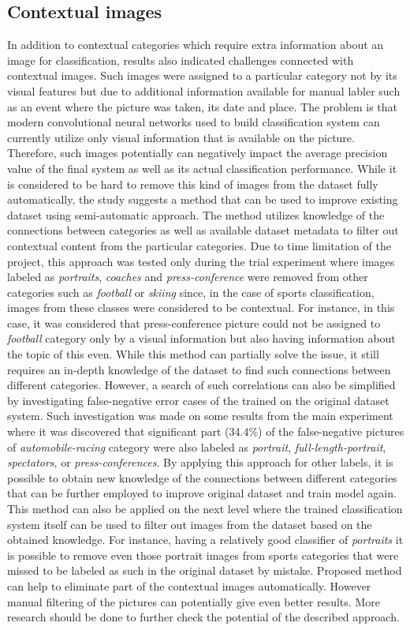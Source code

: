 \subsection{Contextual images}
In addition to contextual categories which require extra information about an image for classification, results also indicated challenges connected with contextual images. Such images were assigned to a particular category not by its visual features but due to additional information available for manual labler such as an event where the picture was taken, its date and place. The problem is that modern convolutional neural networks used to build classification system can currently utilize only visual information that is available on the picture. Therefore, such images potentially can negatively impact the average precision value of the final system as well as its actual classification performance. While it is considered to be hard to remove this kind of images from the dataset fully automatically, the study suggests a method that can be used to improve existing dataset using semi-automatic approach. The method utilizes knowledge of the connections between categories as well as available dataset metadata to filter out contextual content from the particular categories. Due to time limitation of the project, this approach was tested only during the trial experiment where images labeled as \textit{portraits}, \textit{coaches} and \textit{press-conference} were removed from other categories such as \textit{football} or \textit{skiing} since, in the case of sports classification, images from these classes were considered to be contextual. For instance, in this case, it was considered that press-conference picture could not be assigned to \textit{football} category only by a visual information but also having information about the topic of this even. While this method can partially solve the issue, it still requires an in-depth knowledge of the dataset to find such connections between different categories. However, a search of such correlations can also be simplified by investigating false-negative error cases of the trained on the original dataset system. Such investigation was made on some results from the main experiment where it was discovered that significant part (34.4\%) of the false-negative pictures of \textit{automobile-racing} category were also labeled as \textit{portrait}, \textit{full-length-portrait}, \textit{spectators}, or \textit{press-conferences}. By applying this approach for other labels, it is possible to obtain new knowledge of the connections between different categories that can be further employed to improve original dataset and train model again. This method can also be applied on the next level where the trained classification system itself can be used to filter out images from the dataset based on the obtained knowledge. For instance, having a relatively good classifier of \textit{portraits} it is possible to remove even those portrait images from sports categories that were missed to be labeled as such in the original dataset by mistake. Proposed method can help to eliminate part of the contextual images automatically. However manual filtering of the pictures can potentially give even better results. More research should be done to further check the potential of the described approach.

